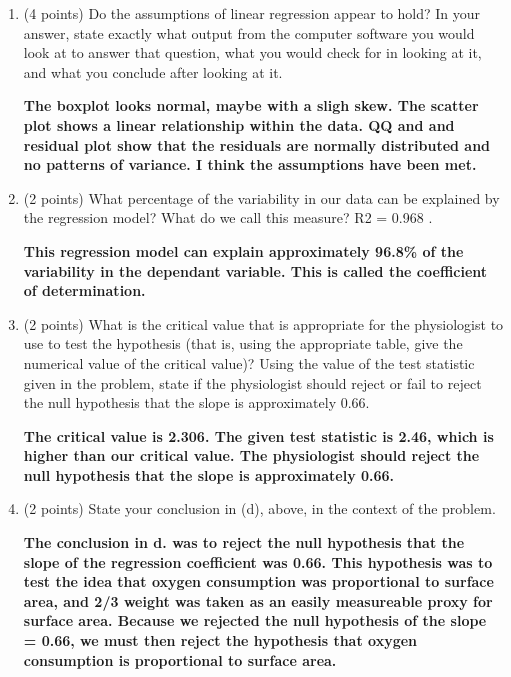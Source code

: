\documentclass{article}
\begin{document}
\begin{enumerate}
\begin{enumerate}
		\item (4 points) Do the assumptions of linear regression appear to hold? In your answer, state exactly what output from the computer software you would look at to answer that question, what you would check for in looking at it, and what you conclude after looking at it.

		\textbf{The boxplot looks normal, maybe with a sligh skew. The scatter plot shows a linear relationship within the data. QQ and and residual plot show that the residuals are normally distributed and no patterns of variance. I think the assumptions have been met.} \\		

		\item (2 points) What percentage of the variability in our data can be explained by the regression model? What do we call this measure? R2 = 0.968 .
		
		\textbf{This regression model can explain approximately 96.8\% of the variability in the dependant variable. This is called the coefficient of determination.} \\
		
		\item (2 points) What is the critical value that is appropriate for the physiologist to use to test the hypothesis (that is, using the appropriate table, give the numerical value of the critical value)? Using the value of the test statistic given in the problem, state if the physiologist should reject or fail to reject the null hypothesis that the slope is approximately 0.66.
		
		\textbf{The critical value is 2.306. The given test statistic is 2.46, which is higher than our critical value. The physiologist should reject the null hypothesis that the slope is approximately 0.66.}


		\item (2 points) State your conclusion in (d), above, in the context of the problem.
		
		\textbf{The conclusion in d. was to reject the null hypothesis that the slope of the regression coefficient was 0.66. This hypothesis was to test the idea that oxygen consumption was proportional to surface area, and 2/3 weight was taken as an easily measureable proxy for surface area. Because we rejected the null hypothesis of the slope = 0.66, we must then reject the hypothesis that oxygen consumption is proportional to surface area.}
	\end{enumerate}



\end{enumerate}
\end{document}
